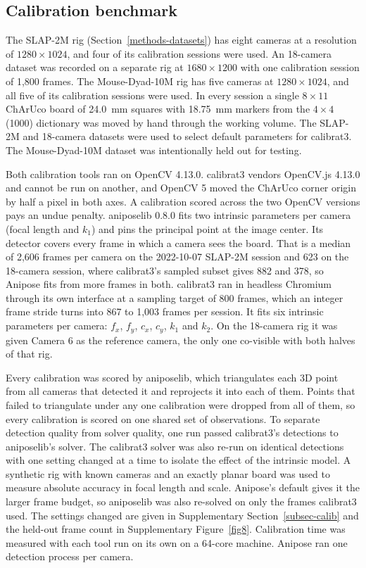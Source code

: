 \documentclass[pdflatex, sn-nature]{sn-jnl}
\theoremstyle{thmstyleone}%
\theoremstyle{thmstyletwo}%
\theoremstyle{thmstylethree}%
\begin{document}
\subsection{Calibration benchmark}\label{methods-calib-bench}

The SLAP-2M rig (Section~\ref{methods-datasets}) has eight cameras at a resolution of $1280 \times 1024$, and four of its calibration sessions were used. An 18-camera dataset was recorded on a separate rig at $1680 \times 1200$ with one calibration session of 1,800 frames. The Mouse-Dyad-10M rig has five cameras at $1280 \times 1024$, and all five of its calibration sessions were used. In every session a single $8 \times 11$ ChArUco board of 24.0~mm squares with 18.75~mm markers from the $4 \times 4$ (1000) dictionary was moved by hand through the working volume. The SLAP-2M and 18-camera datasets were used to select default parameters for calibrat3. The Mouse-Dyad-10M dataset was intentionally held out for testing.

Both calibration tools ran on OpenCV 4.13.0. calibrat3 vendors OpenCV.js 4.13.0 and cannot be run on another, and OpenCV 5 moved the ChArUco corner origin by half a pixel in both axes. A calibration scored across the two OpenCV versions pays an undue penalty. aniposelib 0.8.0 fits two intrinsic parameters per camera (focal length and $k_1$) and pins the principal point at the image center. Its detector covers every frame in which a camera sees the board. That is a median of 2,606 frames per camera on the 2022-10-07 SLAP-2M session and 623 on the 18-camera session, where calibrat3's sampled subset gives 882 and 378, so Anipose fits from more frames in both. calibrat3 ran in headless Chromium through its own interface at a sampling target of 800 frames, which an integer frame stride turns into 867 to 1,003 frames per session. It fits six intrinsic parameters per camera: $f_x$, $f_y$, $c_x$, $c_y$, $k_1$ and $k_2$. On the 18-camera rig it was given Camera 6 as the reference camera, the only one co-visible with both halves of that rig.

Every calibration was scored by aniposelib, which triangulates each 3D point from all cameras that detected it and reprojects it into each of them. Points that failed to triangulate under any one calibration were dropped from all of them, so every calibration is scored on one shared set of observations. To separate detection quality from solver quality, one run passed calibrat3's detections to aniposelib's solver. The calibrat3 solver was also re-run on identical detections with one setting changed at a time to isolate the effect of the intrinsic model. A synthetic rig with known cameras and an exactly planar board was used to measure absolute accuracy in focal length and scale. Anipose's default gives it the larger frame budget, so aniposelib was also re-solved on only the frames calibrat3 used. The settings changed are given in Supplementary Section~\ref{subsec-calib} and the held-out frame count in Supplementary Figure~\ref{fig8}. Calibration time was measured with each tool run on its own on a 64-core machine. Anipose ran one detection process per camera.
\end{document}
